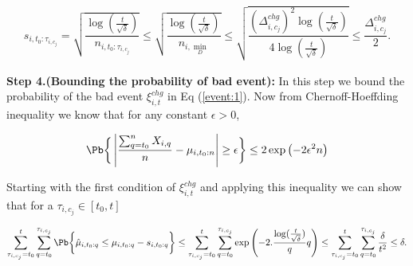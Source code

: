 \begin{customproof}{1}
\begin{align*}
s_{i,t_0:\tau_{i,c_j}} = \sqrt{\dfrac{\log(\frac{t}{\sqrt{\delta}})}{n_{i,t_0:\tau_{i,c_j}}}} \leq \sqrt{\dfrac{\log(\frac{t}{\sqrt{\delta}})}{n_{i,\min_{D}}}} \leq \sqrt{\dfrac{(\Delta^{chg}_{i,c_j})^2\log(\frac{t}{\sqrt{\delta}})}{4\log(\frac{t}{\sqrt{\delta}})}} \leq \dfrac{\Delta^{chg}_{i,c_j}}{2}.
\end{align*} 


\textbf{Step 4.(Bounding the probability of bad event): } In this step we bound the probability of the bad event $\xi^{chg}_{i,t}$ in Eq (\ref{event:1}). Now from Chernoff-Hoeffding inequality we know that for any constant $\epsilon > 0$,

\begin{align*}
\Pb\bigg\lbrace\left| \dfrac{\sum_{q=t_0}^{n} X_{i,q}}{n} - \mu_{i,t_0:n}\right| \geq \epsilon\bigg\rbrace \leq 2\exp\left(-2\epsilon^2 n\right)   
\end{align*}

Starting with the first condition of $\xi^{chg}_{i,t}$ and applying this inequality we can show that for a $\tau_{i,c_j}\in [t_0,t]$

\begin{align*}
\sum_{\tau_{i,c_j}=t_0}^{t} \sum_{q=t_0}^{\tau_{i,c_j}}\Pb\bigg\lbrace\hat{\mu}_{i,t_0:q} \leq \mu_{i,t_0:q} - s_{i,t_0:q}\bigg\rbrace \leq \sum_{\tau_{i,c_j}=t_0}^{t} \sum_{q=t_0}^{\tau_{i,c_j}}\exp\left(-2.\dfrac{\log(\frac{t}{\sqrt{\delta}})}{q}q \right)\leq \sum_{\tau_{i,c_j}=t_0}^{t} \sum_{q=t_0}^{\tau_{i,c_j}}\dfrac{\delta}{t^2}\leq \delta.
\end{align*}


%


\end{customproof}
